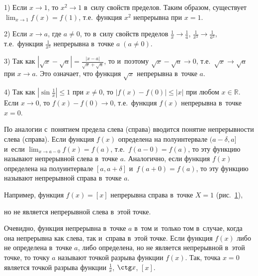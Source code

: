1) Если $x \to 1$, то $x^{2} \to 1$ в~силу свойств пределов. Таким образом, существует
$\displaystyle \lim_{x \to 1} f(x) = f(1)$, т.е.\ функция $x^{2}$ непрерывна при $x = 1$.

2) Если $x \to a$, где $a \ne 0$, то в~силу свойств пределов
$\displaystyle \frac{1}{x} \to \frac{1}{a}$,
$\displaystyle \frac{1}{x^{3}} \to \frac{1}{a^{3}}$,
т.е.\ функция $\displaystyle \frac{1}{x^{3}}$ непрерывна в~точке $a \; (a \ne 0)$.

3) Так как
$\displaystyle \left| \sqrt{x} - \sqrt{a} \right| =
\frac{\left| x - a \right|}{\sqrt{x} + \sqrt{a}}$,
то и~поэтому $\sqrt{x} - \sqrt{a} \to 0$,
т.е.\ $\sqrt{x} \to \sqrt{a}$ при $x \to a$. 
Это означает, что функция $\sqrt{x}$ непрерывна в~точке $a$.

4) Так как $\displaystyle \left| \sin \frac{1}{x} \right| \leqslant 1$ при $x \ne 0$, 
то $\left| f(x) - f(0) \right| \leqslant |x|$ при любом $x \in \mathbb{R}$.
Если $x \to 0$, то $f(x) - f(0) \to 0$, т.е.\ функция $f(x)$ непрерывна в~точке $x = 0$.

По аналогии с~понятием предела слева (справа) вводится понятие непрерывности слева (справа).
Если функция $f(x)$ определена на полуинтервале $(a - \delta, a]$
и~если $\displaystyle \lim_{x \to a-0} f(x) = f(a)$, т.е.\ $f(a-0) = f(a)$,
то эту функцию называют непрерывной слева в~точке $a$.
Аналогично, если функция $f(x)$ определена на полуинтервале $[a, a + \delta]$
и~$f(a+0) = f(a)$, то эту функцию называют непрерывной справа в~точке $a$.

Например, функция $f(x) = [x]$ непрерывна справа в~точке $X = 1$ (рис.\ \ref{fig:4_2_1_9}),

\begin{figure}\label{fig:4_2_1_9}
\end{figure}

\noindent
но не является непрерывной слева в~этой точке.

Очевидно, функция непрерывна в~точке $a$ в~том и~только том в~случае,
когда она непрерывна как слева, так и~справа в~этой точке.
Если функция $f(x)$ либо не определена в~точке $a$, либо определена, но не является
непрерывной в~этой точке, то точку $a$ называют точкой разрыва функции $f(x)$.
Так, точка $x = 0$ является точкой разрыва функции $\displaystyle \frac{1}{x}$,
$\ctg x$, $[x]$.

